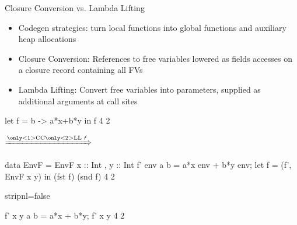 \documentclass{haskellbeamer}
\newcommand{\id}[1]{\textsf{\textsl{#1}}\xspace}
\newcommand{\idf}{\id{f}}
\begin{document}
\begin{frame}[fragile]{Closure Conversion vs. Lambda Lifting}
  \begin{itemize}
    \item Codegen strategies: turn local functions into global functions and auxiliary heap allocations
    \item Closure Conversion: References to free variables lowered as fields accesses on a closure record containing all FVs
    \item Lambda Lifting: Convert free variables into parameters, supplied as additional arguments at call sites
  \end{itemize}
  \begin{center}
    \begin{overprint}
      \begin{minipage}{0.45\textwidth}
        \begin{haskell}
          let f = \a b -> a*x+b*y
          in f 4 2
        \end{haskell}
      \end{minipage}%
      \begin{minipage}{0.1\textwidth}
        $\xRightarrow{\text{\only<1>{CC}\only<2>{LL} }\idf}$
      \end{minipage}%
      \begin{minipage}{0.45\textwidth}
        \begin{haskell}
          data EnvF = EnvF
            { x :: Int
            , y :: Int }
          f' env a b =
            a*x env + b*y env;
          let f = (f', EnvF x y)
          in (fst f) (snd f) 4 2
        \end{haskell}
      \end{minipage}
      \begin{minipage}{0.45\textwidth}
        \begin{haskell*}{stripnl=false}
          


          f' x y a b = a*x + b*y;
          f' x y 4 2
        \end{haskell*}
      \end{minipage}
    \end{overprint}
  \end{center}
\end{frame}
\end{document}
